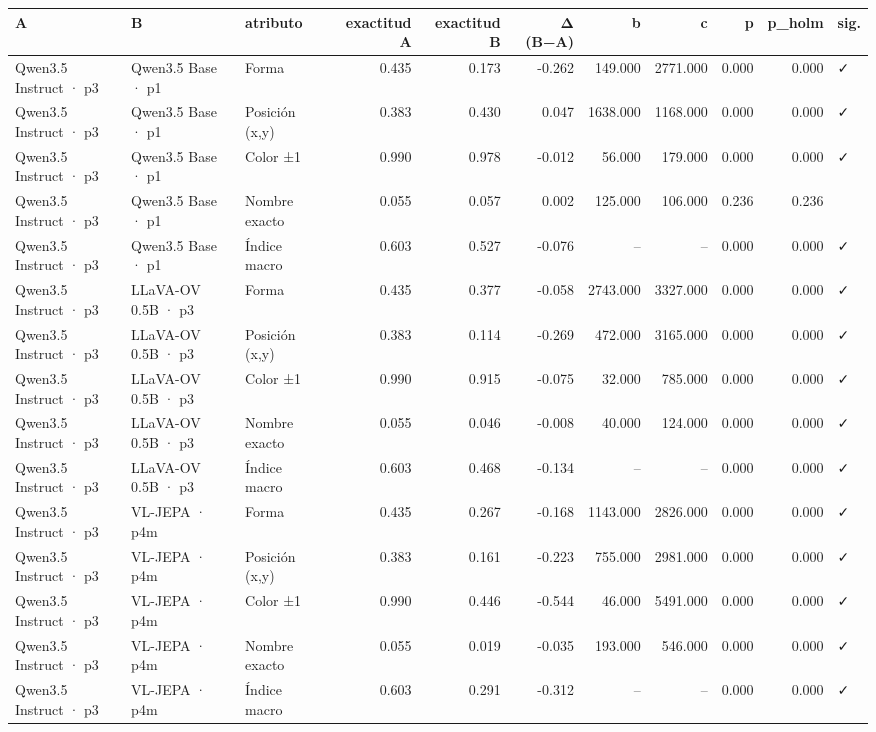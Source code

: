 \begin{tabular}{lllrrrrrrrl}
\toprule
A & B & atributo & exactitud A & exactitud B & Δ (B−A) & b & c & p & p\_holm & sig. \\
\midrule
Qwen3.5 Instruct · p3 & Qwen3.5 Base · p1 & Forma & 0.435 & 0.173 & -0.262 & 149.000 & 2771.000 & 0.000 & 0.000 & ✓ \\
Qwen3.5 Instruct · p3 & Qwen3.5 Base · p1 & Posición (x,y) & 0.383 & 0.430 & 0.047 & 1638.000 & 1168.000 & 0.000 & 0.000 & ✓ \\
Qwen3.5 Instruct · p3 & Qwen3.5 Base · p1 & Color ±1 & 0.990 & 0.978 & -0.012 & 56.000 & 179.000 & 0.000 & 0.000 & ✓ \\
Qwen3.5 Instruct · p3 & Qwen3.5 Base · p1 & Nombre exacto & 0.055 & 0.057 & 0.002 & 125.000 & 106.000 & 0.236 & 0.236 &  \\
Qwen3.5 Instruct · p3 & Qwen3.5 Base · p1 & Índice macro & 0.603 & 0.527 & -0.076 & -- & -- & 0.000 & 0.000 & ✓ \\
Qwen3.5 Instruct · p3 & LLaVA-OV 0.5B · p3 & Forma & 0.435 & 0.377 & -0.058 & 2743.000 & 3327.000 & 0.000 & 0.000 & ✓ \\
Qwen3.5 Instruct · p3 & LLaVA-OV 0.5B · p3 & Posición (x,y) & 0.383 & 0.114 & -0.269 & 472.000 & 3165.000 & 0.000 & 0.000 & ✓ \\
Qwen3.5 Instruct · p3 & LLaVA-OV 0.5B · p3 & Color ±1 & 0.990 & 0.915 & -0.075 & 32.000 & 785.000 & 0.000 & 0.000 & ✓ \\
Qwen3.5 Instruct · p3 & LLaVA-OV 0.5B · p3 & Nombre exacto & 0.055 & 0.046 & -0.008 & 40.000 & 124.000 & 0.000 & 0.000 & ✓ \\
Qwen3.5 Instruct · p3 & LLaVA-OV 0.5B · p3 & Índice macro & 0.603 & 0.468 & -0.134 & -- & -- & 0.000 & 0.000 & ✓ \\
Qwen3.5 Instruct · p3 & VL-JEPA · p4m & Forma & 0.435 & 0.267 & -0.168 & 1143.000 & 2826.000 & 0.000 & 0.000 & ✓ \\
Qwen3.5 Instruct · p3 & VL-JEPA · p4m & Posición (x,y) & 0.383 & 0.161 & -0.223 & 755.000 & 2981.000 & 0.000 & 0.000 & ✓ \\
Qwen3.5 Instruct · p3 & VL-JEPA · p4m & Color ±1 & 0.990 & 0.446 & -0.544 & 46.000 & 5491.000 & 0.000 & 0.000 & ✓ \\
Qwen3.5 Instruct · p3 & VL-JEPA · p4m & Nombre exacto & 0.055 & 0.019 & -0.035 & 193.000 & 546.000 & 0.000 & 0.000 & ✓ \\
Qwen3.5 Instruct · p3 & VL-JEPA · p4m & Índice macro & 0.603 & 0.291 & -0.312 & -- & -- & 0.000 & 0.000 & ✓ \\

\end{tabular}
